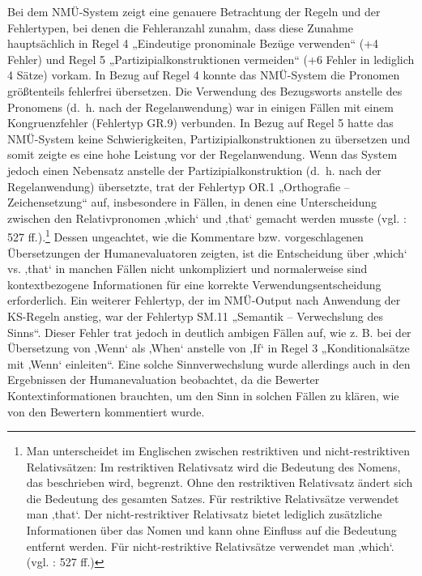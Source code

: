 Bei dem NMÜ-System zeigt eine genauere Betrachtung der Regeln und der Fehlertypen, bei denen die Fehleranzahl zunahm, dass diese Zunahme hauptsächlich in Regel 4 „Eindeutige pronominale Bezüge verwenden“ (+4 Fehler) und Regel 5 „Partizipialkonstruktionen vermeiden“ (+6 Fehler in lediglich 4 Sätze) vorkam. In Bezug auf Regel 4 konnte das NMÜ-System die Pronomen größtenteils fehlerfrei übersetzen. Die Verwendung des Bezugsworts anstelle des Pronomens (d.~h. nach der Regelanwendung) war in einigen Fällen mit einem Kongruenzfehler (Fehlertyp GR.9) verbunden. In Bezug auf Regel 5 hatte das NMÜ-System keine Schwierigkeiten, Partizipialkonstruktionen zu übersetzen und somit zeigte es eine hohe Leistung vor der Regelanwendung. Wenn das System jedoch einen Nebensatz anstelle der Partizipialkonstruktion (d.~h. nach der Regelanwendung) übersetzte, trat der Fehlertyp OR.1 „Orthografie – Zeichensetzung“ auf, insbesondere in Fällen, in denen eine Unterscheidung zwischen den Relativpronomen ‚which‘ und ‚that‘ gemacht werden musste (vgl. \citealt{Swan1980}: 527 ff.).\footnote{{{{Man unterscheidet im Englischen zwischen restriktiven und nicht-restriktiven Relativsätzen: Im restriktiven Relativsatz wird die Bedeutung des Nomens, das beschrieben wird, begrenzt. Ohne den restriktiven Relativsatz ändert sich die Bedeutung des gesamten Satzes. Für restriktive Relativsätze verwendet man ‚that‘. Der nicht-restriktiver Relativsatz bietet lediglich zusätzliche Informationen über das Nomen und kann ohne Einfluss auf die Bedeutung entfernt werden. Für nicht-restriktive Relativsätze verwendet man ‚which‘. (vgl. \citealt{Swan1980}: 527 ff.)}}}} Dessen ungeachtet, wie die Kommentare bzw. vorgeschlagenen Übersetzungen der Humanevaluatoren zeigten, ist die Entscheidung über ‚which‘ vs. ‚that‘ in manchen Fällen nicht unkompliziert und normalerweise sind kontextbezogene Informationen für eine korrekte Verwendungsentscheidung erforderlich. Ein weiterer Fehlertyp, der im NMÜ-Output nach Anwendung der KS-Regeln anstieg, war der Fehlertyp SM.11 „Semantik – Verwechslung des Sinns“. Dieser Fehler trat jedoch in deutlich ambigen Fällen auf, wie z. B. bei der Übersetzung von ‚Wenn‘ als ‚When‘ anstelle von ‚If‘ in Regel 3 „Konditionalsätze mit ‚Wenn‘ einleiten“. Eine solche Sinnverwechslung wurde allerdings auch in den Ergebnissen der Humanevaluation beobachtet, da die Bewerter Kontextinformationen brauchten, um den Sinn in solchen Fällen zu klären, wie von den Bewertern kommentiert wurde.

